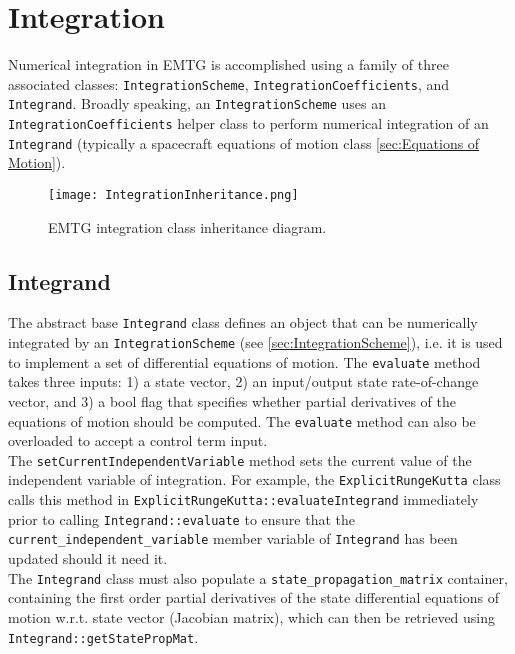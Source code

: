 \chapter{Integration}
\label{chap:integration}

Numerical integration in EMTG is accomplished using a family of three associated classes: \texttt{IntegrationScheme}, \texttt{IntegrationCoefficients}, and \texttt{Integrand}. Broadly speaking, an \texttt{IntegrationScheme} uses an \texttt{IntegrationCoefficients} helper class to perform numerical integration of an \texttt{Integrand} (typically a spacecraft equations of motion class \ref{sec:Equations of Motion}).

\begin{figure}[h!]
    \centering
    \texttt{[image: IntegrationInheritance.png]}
    \caption{\label{fig:IntegrationInhseritance} EMTG integration class inheritance diagram.}
\end{figure}

\section{Integrand}
\label{sec:Integrand}
The abstract base \texttt{Integrand} class defines an object that can be numerically integrated by an \texttt{IntegrationScheme} (see \ref{sec:IntegrationScheme}), i.e. it is used to implement a set of differential equations of motion. The \texttt{evaluate} method takes three inputs: 1) a state vector, 2) an input/output state rate-of-change vector, and 3) a bool flag that specifies whether partial derivatives of the equations of motion should be computed. The \texttt{evaluate} method can also be overloaded to accept a control term input. \\

The \texttt{setCurrentIndependentVariable} method sets the current value of the independent variable of integration. For example, the \texttt{ExplicitRungeKutta} class calls this method in \texttt{ExplicitRungeKutta::evaluateIntegrand} immediately prior to calling \texttt{Integrand::evaluate} to ensure that the \texttt{current\_independent\_variable} member variable of \texttt{Integrand} has been updated should it need it. \\

The \texttt{Integrand} class must also populate a \texttt{state\_propagation\_matrix} container, containing the first order partial derivatives of the state differential equations of motion w.r.t. state vector (Jacobian matrix), which can then be retrieved using \texttt{Integrand::getStatePropMat}. 


